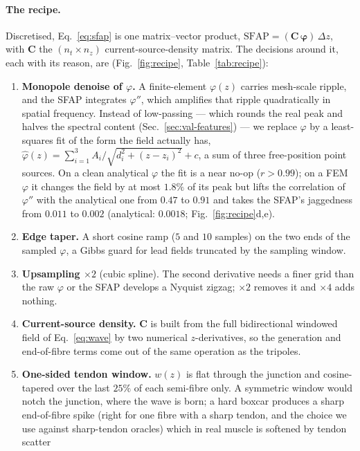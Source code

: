 \documentclass[11pt,a4paper]{article}
\begin{document}
\paragraph{The recipe.} Discretised, Eq.~\eqref{eq:sfap} is one matrix--vector product,
$\mathrm{SFAP} = (\mathbf{C}\,\boldsymbol{\varphi})\,\Delta z$, with $\mathbf{C}$ the
$(n_t \times n_z)$ current-source-density matrix. The decisions around it, each with its
reason, are (Fig.~\ref{fig:recipe}, Table~\ref{tab:recipe}):
\begin{enumerate}
\item \textbf{Monopole denoise of $\varphi$.} A finite-element $\varphi(z)$ carries
  mesh-scale ripple, and the SFAP integrates $\varphi''$, which amplifies that ripple
  quadratically in spatial frequency. Instead of low-passing --- which rounds the real
  peak and halves the spectral content (Sec.~\ref{sec:val-features}) --- we replace
  $\varphi$ by a least-squares fit of the form the field actually has,
  $\hat\varphi(z) = \sum_{i=1}^{3} A_i/\sqrt{d_i^{2}+(z-z_i)^{2}} + c$, a sum of three
  free-position point sources. On a clean analytical $\varphi$ the fit is a near no-op
  ($r>0.99$); on a FEM $\varphi$ it changes the field by at most $1.8\%$ of its peak but
  lifts the correlation of $\varphi''$ with the analytical one from $0.47$ to $0.91$ and
  takes the SFAP's jaggedness from $0.011$ to $0.002$ (analytical: $0.0018$;
  Fig.~\ref{fig:recipe}d,e).
\item \textbf{Edge taper.} A short cosine ramp ($5$ and $10$ samples) on the two ends of
  the sampled $\varphi$, a Gibbs guard for lead fields truncated by the sampling window.
\item \textbf{Upsampling $\times 2$} (cubic spline). The second derivative needs a finer
  grid than the raw $\varphi$ or the SFAP develops a Nyquist zigzag; $\times2$ removes
  it and $\times4$ adds nothing.
\item \textbf{Current-source density.} $\mathbf{C}$ is built from the full bidirectional
  windowed field of Eq.~\eqref{eq:wave} by two numerical $z$-derivatives, so the
  generation and end-of-fibre terms come out of the same operation as the tripoles.
\item \textbf{One-sided tendon window.} $w(z)$ is flat through the junction and
  cosine-tapered over the last $25\%$ of each semi-fibre only. A symmetric window would
  notch the junction, where the wave is born; a hard boxcar produces a sharp end-of-fibre
  spike (right for one fibre with a sharp tendon, and the choice we use against
  sharp-tendon oracles) which in real muscle is softened by tendon scatter

\end{enumerate}
\end{document}
